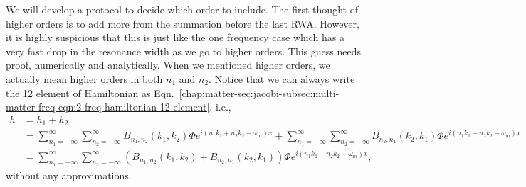 We will develop a protocol to decide which order to include. The first thought of higher orders is to add more from the summation before the last RWA. However, it is highly suspicious that this is just like the one frequency case which has a very fast drop in the resonance width as we go to higher orders. This guess needs proof, numerically and analytically. When we mentioned higher orders, we actually mean higher orders in both $n_1$ and $n_2$. Notice that we can always write the 12 element of Hamiltonian as Eqn.~\ref{chap:matter-sec:jacobi-subsec:multi-matter-freq-eqn:2-freq-hamiltonian-12-element}, i.e.,
\begin{align}
  h &= h_1 + h_2 \\
  & = \sum_{n_1=-\infty}^\infty \sum_{n_2=-\infty}^{\infty} B_{n_1,n_2}(k_1,k_2) \Phi e^{i(n_1 k_1 + n_2 k_2 - \omega_m)x} +  \sum_{n_1=-\infty}^\infty \sum_{n_2=-\infty}^{\infty} B_{n_2,n_1}(k_2,k_1) \Phi e^{i(n_1 k_1 + n_2 k_2 - \omega_m)x} \nonumber\\
  & = \sum_{n_1=-\infty}^\infty \sum_{n_2=-\infty}^{\infty} \left( B_{n_1,n_2}(k_1,k_2) + B_{n_2,n_1}(k_2,k_1) \right) \Phi e^{i(n_1 k_1 + n_2 k_2 - \omega_m)x},
\end{align}
without any approximations.
